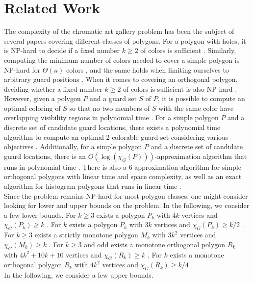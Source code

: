 \section{Related Work}
The complexity of the chromatic art gallery problem has been the subject of several papers covering different classes of polygons.
For a polygon with holes, it is NP-hard to decide if a fixed number $k \geq 2$ of colors is sufficient \cite{fekete2014complexity}. Similarly, computing the minimum number of colors needed to cover a simple polygon is NP-hard for $\Theta(n)$ colors \cite{fekete2014complexity}, and the same holds when limiting ourselves to arbitrary guard positions \cite{fekete2014chromatic}. When it comes to covering an orthogonal polygon, deciding whether a fixed number $k \geq 2$ of colors is sufficient is also NP-hard \cite{hoorfar2021np}. However, given a polygon $P$ and a guard set $S$ of $P$, it is possible to compute an optimal coloring of $S$ so that no two members of $S$ with the same color have overlapping visibility regions in polynomial time \cite{erickson2011many}. For a simple polygon $P$ and a discrete set of candidate guard locations, there exists a polynomial time algorithm to compute an optimal 2-colorable guard set considering various objectives \cite{fekete2014chromatic}. Additionally, for a simple polygon $P$ and a discrete set of candidate guard locations, there is an $O(\log (\chi_G(P)))$-approximation algorithm that runs in polynomial time \cite{fekete2014chromatic}. There is also a 6-approximation algorithm for simple orthogonal polygons with linear time and space complexity, as well as an exact algorithm for histogram polygons that runs in linear time \cite{hoorfar2021np}.\\
Since the problem remains NP-hard for most polygon classes, one might consider looking for lower and upper bounds on the problem.
In the following, we consider a few lower bounds.
For $k \geq 3$ exists a polygon $P_k$ with $4k$ vertices and $\chi_G(P_k) \geq k$ \cite{erickson2012art}.
For $k$ exists a polygon $P_k$ with $3k$ vertices and $\chi_G(P_k) \geq k/2$ \cite{bartschi2011coloring}.
For $k \geq 3$ exists a strictly monotone polygon $M_k$ with $3k^2$ vertices and $\chi_G(M_k) \geq k$ \cite{erickson2012art}.
For $k \geq 3$ and odd exists a monotone orthogonal polygon $R_k$ with $4k^2 + 10k + 10$ vertices and $\chi_G(R_k) \geq k$ \cite{erickson2012art}.
For $k$ exists a monotone orthogonal polygon $R_k$ with $4k^2$ vertices and $\chi_G(R_k) \geq k/4$ \cite{bartschi2011coloring}.\\
In the following, we consider a few upper bounds.
